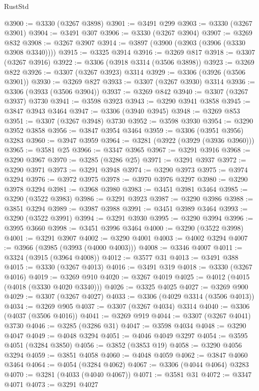 \begin{lexlean}{RustStd}
\begin{coremodule}
@3900 := @3330 (@3267 @3898)
@3901 := @3491 @299
@3903 := @3330 (@3267 @3901)
@3904 := @3491 @307
@3906 := @3330 (@3267 @3904)
@3907 := @3269 @832
@3908 := @3267 @3907
@3914 := @3897 (@3900 (@3903 (@3906 (@3330 @3908 @3340))))
@3915 := @3325 @3914
@3916 := @3269 @817
@3918 := @3307 (@3267 @3916)
@3922 := @3306 (@3918 @3314 (@3506 @3898))
@3923 := @3269 @822
@3926 := @3307 (@3267 @3923) @3314
@3929 := @3306 (@3926 (@3506 @3901))
@3930 := @3269 @827
@3933 := @3307 (@3267 @3930) @3314
@3936 := @3306 (@3933 (@3506 @3904))
@3937 := @3269 @842
@3940 := @3307 (@3267 @3937) @3730
@3941 := @3598 @3923
@3943 := @3290 @3941 @3858
@3945 := @3847 @3943 @3464
@3947 := @3306 (@3940 @3945)
@3948 := @3269 @853
@3951 := @3307 (@3267 @3948) @3730
@3952 := @3598 @3930
@3954 := @3290 @3952 @3858
@3956 := @3847 @3954 @3464
@3959 := @3306 (@3951 @3956) @3283
@3960 := @3947 @3959
@3964 := @3281 (@3922 (@3929 (@3936 @3960)))
@3965 := @3581 @25
@3966 := @3347 @3965
@3967 := @3291 @3916
@3968 := @3290 @3967
@3970 := @3285 (@3286 @25)
@3971 := @3291 @3937
@3972 := @3290 @3971
@3973 := @3291 @3948
@3974 := @3290 @3973
@3975 := @3974 @3294
@3976 := @3972 @3975
@3978 := @3970 @3976 @3297
@3980 := @3290 @3978 @3294
@3981 := @3968 @3980
@3983 := @3451 @3981 @3464
@3985 := @3290 (@3522 @3983)
@3986 := @3291 @3923
@3987 := @3290 @3986
@3988 := @3851 @3294
@3989 := @3987 @3988
@3991 := @3451 @3989 @3464
@3993 := @3290 (@3522 @3991)
@3994 := @3291 @3930
@3995 := @3290 @3994
@3996 := @3995 @3660
@3998 := @3451 @3996 @3464
@4000 := @3290 (@3522 @3998)
@4001 := @3291 @3907
@4002 := @3290 @4001
@4003 := @4002 @3294
@4007 := @3966 (@3985 (@3993 (@4000 @4003)))
@4008 := @3346 @4007
@4011 := @3324 (@3915 (@3964 @4008))
@4012 := @3577 @31
@4013 := @3491 @388
@4015 := @3330 (@3267 @4013)
@4016 := @3491 @319
@4018 := @3330 (@3267 @4016)
@4019 := @3269 @910
@4020 := @3267 @4019
@4025 := @4012 (@4015 (@4018 (@3330 @4020 @3340)))
@4026 := @3325 @4025
@4027 := @3269 @900
@4029 := @3307 (@3267 @4027)
@4033 := @3306 (@4029 @3314 (@3506 @4013))
@4034 := @3269 @905
@4037 := @3307 (@3267 @4034) @3314
@4040 := @3306 (@4037 (@3506 @4016))
@4041 := @3269 @919
@4044 := @3307 (@3267 @4041) @3730
@4046 := @3285 (@3286 @31)
@4047 := @3598 @4034
@4048 := @3290 @4047
@4049 := @4048 @3294
@4051 := @4046 @4049 @3297
@4054 := @3595 @4051 (@3284 @3850)
@4056 := @3852 (@3853 @19)
@4058 := @3290 @4056 @3294
@4059 := @3851 @4058
@4060 := @4048 @4059
@4062 := @3847 @4060 @3464
@4064 := @4054 (@3284 @4062)
@4067 := @3306 (@4044 @4064) @3283
@4070 := @3281 (@4033 (@4040 @4067))
@4071 := @3581 @31
@4072 := @3347 @4071
@4073 := @3291 @4027

\end{coremodule}
\end{lexlean}
